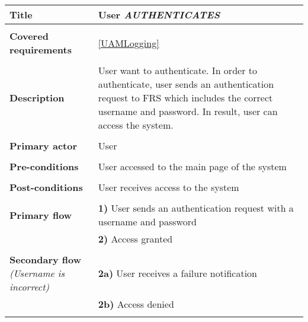\documentclass[a4paper,11pt]{article}
\begin{document}
\begin{tabular}{|p{3.5cm}|p{11.5cm}|} \hline
    \textbf{Title} &   User \emph{AUTHENTICATES}

    \\ \hline \rowcolor{Gray} & \\ \hline

    \textbf{Covered requirements} & \ref{UAMLogging}
  
    \\ \hline \rowcolor{Gray} & \\ \hline 
  
    \textbf{Description} &  User want to authenticate. In order to authenticate, user sends an authentication request to FRS which includes the correct username and password. In result, user can access the system. 
   
    \\ \hline \rowcolor{Gray} & \\ \hline 
   
    \textbf{Primary actor} & User   
   
    \\ \hline \rowcolor{Gray} & \\ \hline  
   
    \textbf{Pre-conditions} &   User accessed to the main page of the system 
   
    \\ \hline \rowcolor{Gray} & \\ \hline 
   
    \textbf{Post-conditions} &   User receives access to the system 
   
    \\ \hline \rowcolor{Gray} & \\ \hline  
    
    \textbf{Primary flow} &  
    \textbf{1)} User sends an authentication request with a username and password  \\& 
    \textbf{2)} Access granted
    
    \\ \hline \rowcolor{Gray} & \\ \hline  
    
    \textbf{Secondary flow} \emph{(Username is incorrect)} &  
    \textbf{2a)} User receives a failure notification \\ &
    \textbf{2b)} Access denied
    
    \\ \hline \rowcolor{Gray} & \\ \hline  
    

\end{tabular}
\end{document}
